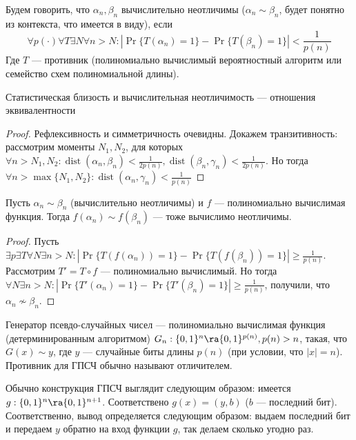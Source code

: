 \begin{definition}
    Будем говорить, что \(\alpha_n, \beta_n\) вычислительно неотличимы (\(\alpha_n \sim \beta_n\), будет понятно из контекста, что имеется в виду), если 
    \[\forall p(\cdot) \forall T \exists N \forall n > N: |\Pr\{T(\alpha_n) = 1\} - \Pr\{T(\beta_n) = 1\}| < \frac{1}{p(n)}\]
    Где \(T\) --- противник (полиномиально вычислимый вероятностный алгоритм или семейство схем полиномиальной длины).
\end{definition}

\begin{note}
    Статистическая близость и вычислительная неотличимость --- отношения эквивалентности
\end{note}
\begin{proof}
    Рефлексивность и симметричность очевидны. Докажем транзитивность: рассмотрим моменты \(N_1, N_2\), для которых \(\forall n > N_1, N_2: \operatorname{dist}(\alpha_n, \beta_n) < \frac{1}{2p(n)}, \operatorname{dist}(\beta_n, \gamma_n) < \frac{1}{2p(n)}\). Но тогда \(\forall n > \max\{N_1, N_2\}: \operatorname{dist}(\alpha_n, \gamma_n) < \frac{1}{p(n)}\)
\end{proof}

\begin{proposition}
    Пусть \(\alpha_n \sim \beta_n\) (вычислительно неотличимы) и \(f\) --- полиномиально вычислимая функция. Тогда \(f(\alpha_n) \sim f(\beta_n)\) --- тоже вычислимо неотличимы.
\end{proposition}
\begin{proof}
    Пусть \(\exists p \exists T \forall N \exists n > N: |\Pr\{T(f(\alpha_n)) = 1\} - \Pr\{T(f(\beta_n)) = 1\}| \ge \frac{1}{p(n)}\).
    Рассмотрим \(T' = T \circ f\) --- полиномиально вычислимый. Но тогда  \(\forall N \exists n > N: |\Pr\{T'(\alpha_n) = 1\} - \Pr\{T'(\beta_n) = 1\}| \ge \frac{1}{p(n)}\), получили, что \(\alpha_n \not\sim \beta_n\).
\end{proof}

\begin{definition}
    Генератор псевдо-случайных чисел --- полиномиально вычислимая функция (детерминированным алгоритмом) \(G_n: \{0, 1\}^n \ra \{0, 1\}^{p(n)}, p(n) > n\), такая, что \(G(x) \sim y\), где \(y\) --- случайные биты длины \(p(n)\) (при условии, что \(|x| = n\)). Противник для ГПСЧ обычно называют отличителем.
\end{definition}

\begin{note}
    Обычно конструкция ГПСЧ выглядит следующим образом: имеется \(g: \{0, 1\}^n \ra \{0, 1\}^{n + 1}\). Соответствено \(g(x) = (y, b)\) (\(b\) --- последний бит). Соответственно, вывод определяется следующим образом: выдаем последний бит и передаем \(y\) обратно на вход функции \(g\), так делаем сколько угодно раз.
\end{note}

